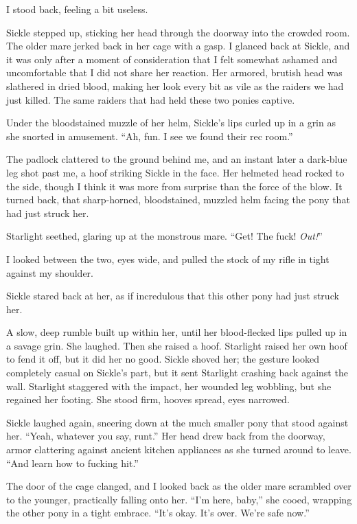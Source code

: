 I stood back, feeling a bit useless.

Sickle stepped up, sticking her head through the doorway into the crowded room. The older mare jerked back in her cage with a gasp. I glanced back at Sickle, and it was only after a moment of consideration that I felt somewhat ashamed and uncomfortable that I did not share her reaction. Her armored, brutish head was slathered in dried blood, making her look every bit as vile as the raiders we had just killed. The same raiders that had held these two ponies captive.

Under the bloodstained muzzle of her helm, Sickle’s lips curled up in a grin as she snorted in amusement. “Ah, fun. I see we found their rec room.”

The padlock clattered to the ground behind me, and an instant later a dark-blue leg shot past me, a hoof striking Sickle in the face. Her helmeted head rocked to the side, though I think it was more from surprise than the force of the blow. It turned back, that sharp-horned, bloodstained, muzzled helm facing the pony that had just struck her.

Starlight seethed, glaring up at the monstrous mare. “Get! The fuck! \textit{Out!}”

I looked between the two, eyes wide, and pulled the stock of my rifle in tight against my shoulder.

Sickle stared back at her, as if incredulous that this other pony had just struck her.

A slow, deep rumble built up within her, until her blood-flecked lips pulled up in a savage grin. She laughed. Then she raised a hoof. Starlight raised her own hoof to fend it off, but it did her no good. Sickle shoved her; the gesture looked completely casual on Sickle’s part, but it sent Starlight crashing back against the wall. Starlight staggered with the impact, her wounded leg wobbling, but she regained her footing. She stood firm, hooves spread, eyes narrowed.

Sickle laughed again, sneering down at the much smaller pony that stood against her. “Yeah, whatever you say, runt.” Her head drew back from the doorway, armor clattering against ancient kitchen appliances as she turned around to leave. “And learn how to fucking hit.”

The door of the cage clanged, and I looked back as the older mare scrambled over to the younger, practically falling onto her. “I’m here, baby,” she cooed, wrapping the other pony in a tight embrace. “It’s okay. It’s over. We’re safe now.”

